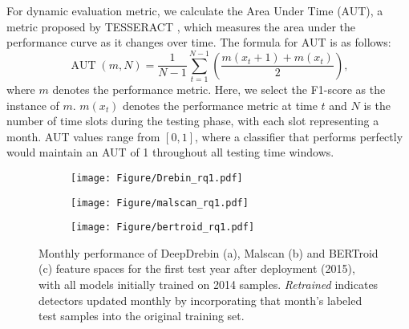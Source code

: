 For dynamic evaluation metric, we calculate the Area Under Time (AUT), a metric proposed by TESSERACT \cite{tesseract}, which measures the area under the performance curve as it changes over time. The formula for AUT is as follows:
\begin{equation}
\operatorname{AUT}(m, N)=\frac{1}{N-1} \sum_{t=1}^{N-1}\left(\frac{m(x_t+1)+m(x_t)}{2}\right),
\end{equation}
where $ m$ denotes the performance metric. Here, we select the F1-score as the instance of $m$. $m(x_t)$ denotes the performance metric at time $t$ and $N$ is the number of time slots during the testing phase, with each slot representing a month. AUT values range from $[0, 1]$, where a classifier that performs perfectly would maintain an AUT of 1 throughout all testing time windows. 



\begin{figure}[ht]
    \centering
    \begin{subfigure}{0.16\textwidth}
        \centering
        \texttt{[image: Figure/Drebin\_rq1.pdf]}
        \caption{}
        \label{fig:sub1}
    \end{subfigure}%
    \hfill
    \begin{subfigure}{0.16\textwidth}
        \centering
        \texttt{[image: Figure/malscan\_rq1.pdf]}
        \caption{}
        \label{fig:sub2}
    \end{subfigure}%
    \hfill
    \begin{subfigure}{0.16\textwidth}
        \centering
        \texttt{[image: Figure/bertroid\_rq1.pdf]}
        \caption{}
        \label{fig:sub3}
    \end{subfigure}
    \caption{Monthly performance of DeepDrebin (a), Malscan (b) and BERTroid (c) feature spaces for the first test year after deployment (2015), with all models initially trained on 2014 samples. \textit{Retrained} indicates detectors updated monthly by incorporating that month's labeled test samples into the original training set.}
    \label{fig:rq1}
    \hfill
\end{figure}

